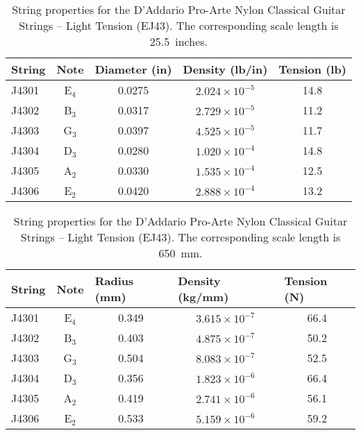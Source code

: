\begin{table}[htbp]
  \centering
  \caption{\label{tbl:ej43_ips} String properties for the D'Addario Pro-Arte Nylon Classical Guitar Strings -- Light Tension (EJ43). The corresponding scale length is 25.5~inches.}
    \begin{tabular}{lcccc}
    \hline \hline
    String  & Note  & \multicolumn{1}{l}{Diameter (in)} & \multicolumn{1}{l}{Density (lb/in)} & \multicolumn{1}{l}{Tension (lb)} \\
    \hline
    J4301 & E$_4$  & 0.0275 & $2.024 \times 10^{-5}$ & 14.8 \\
    J4302 & B$_3$  & 0.0317 & $2.729 \times 10^{-5}$ & 11.2 \\
    J4303 & G$_3$  & 0.0397 & $4.525 \times 10^{-5}$ & 11.7 \\
    J4304 & D$_3$  & 0.0280 & $1.020 \times 10^{-4}$ & 14.8 \\
    J4305 & A$_2$  & 0.0330 & $1.535 \times 10^{-4}$ & 12.5 \\
    J4306 & E$_2$  & 0.0420 & $2.888 \times 10^{-4}$ & 13.2 \\
    \hline
    \end{tabular}%
  \label{tab:addlabel}%
\end{table}%

\begin{table}[htbp]
  \centering
  \caption{\label{tbl:ej43_mks} String properties for the D'Addario Pro-Arte Nylon Classical Guitar Strings -- Light Tension (EJ43). The corresponding scale length is 650~mm.}
    \begin{tabular}{lcccc}
    \hline \hline
    String  & Note  & \multicolumn{1}{l}{Radius (mm)} & \multicolumn{1}{l}{Density (kg/mm)} & \multicolumn{1}{l}{Tension (N)} \\
    \hline
    J4301 & E$_4$  & 0.349 & $3.615 \times 10^{-7}$ & 66.4 \\
    J4302 & B$_3$  & 0.403 & $4.875 \times 10^{-7}$ & 50.2 \\
    J4303 & G$_3$  & 0.504 & $8.083 \times 10^{-7}$ & 52.5 \\
    J4304 & D$_3$  & 0.356 & $1.823 \times 10^{-6}$ & 66.4 \\
    J4305 & A$_2$  & 0.419 & $2.741 \times 10^{-6}$ & 56.1 \\
    J4306 & E$_2$  & 0.533 & $5.159 \times 10^{-6}$ & 59.2 \\
    \hline
    \end{tabular}%
  \label{tab:addlabel}%
\end{table}%



